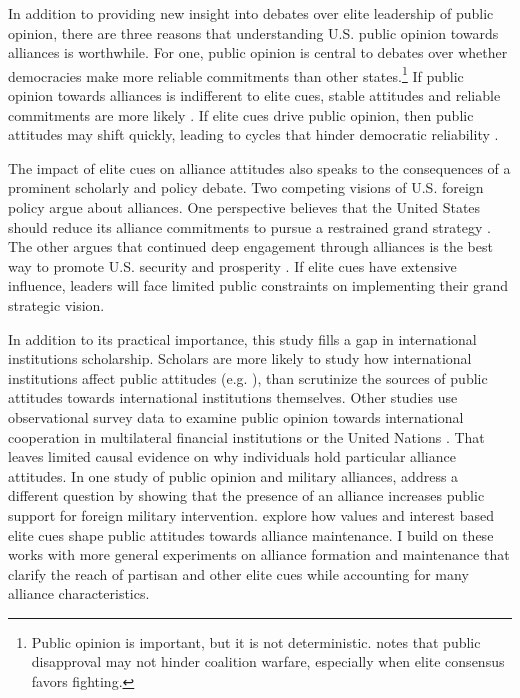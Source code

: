 \documentclass[12pt]{article}
\begin{document}
In addition to providing new insight into debates over elite leadership of public opinion, there are three reasons that understanding U.S. public opinion towards alliances is worthwhile. 
For one, public opinion is central to debates over whether democracies make more reliable commitments than other states.\footnote{Public opinion is important, but it is not deterministic. \citet{Kreps2010} notes that public disapproval may not hinder coalition warfare, especially when elite consensus favors fighting.} 
If public opinion towards alliances is indifferent to elite cues, stable attitudes and reliable commitments are more likely \citep{Gaubatz1996}.
If elite cues drive public opinion, then public attitudes may shift quickly, leading to cycles that hinder democratic reliability \citep{GartzkeGleditsch2004}.


The impact of elite cues on alliance attitudes also speaks to the consequences of a prominent scholarly and policy debate. 
Two competing visions of U.S. foreign policy argue about alliances. 
One perspective believes that the United States should reduce its alliance commitments to pursue a restrained grand strategy \citep{Preble2009, Posen2014}.
The other argues that continued deep engagement through alliances is the best way to promote U.S. security and prosperity \citep{Brooksetal2013, BrandsFeaver2017}. 
If elite cues have extensive influence, leaders will face limited public constraints on implementing their grand strategic vision. 


In addition to its practical importance, this study fills a gap in international institutions scholarship. 
Scholars are more likely to study how international institutions affect public attitudes (e.g. \citep{KayaWalker2014, Greenhill2020}), than scrutinize the sources of public attitudes towards international institutions themselves. 
Other studies use observational survey data to examine public opinion towards international cooperation in multilateral financial institutions \citep{Edwards2009} or the United Nations \citep{Torgler2008, DellmuthTallberg2015}. 
That leaves limited causal evidence on why individuals hold particular alliance attitudes.
In one study of public opinion and military alliances, \citet{TomzWeeks2021} address a different question by showing that the presence of an alliance increases public support for foreign military intervention. 
\citet{Chuetal2021} explore how values and interest based elite cues shape public attitudes towards alliance maintenance. 
I build on these works with more general experiments on alliance formation and maintenance that clarify the reach of partisan and other elite cues while accounting for many alliance characteristics. 
\end{document}
